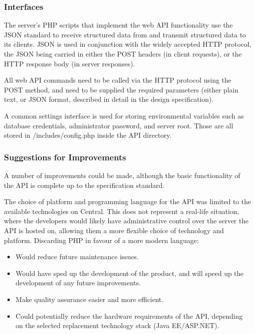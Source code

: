     \subsubsection{Interfaces}
       The server's PHP scripts that implement the web API functionality use the 
    JSON standard to receive structured data from and transmit structured data 
    to its clients. JSON is used in conjunction with the widely accepted HTTP
    protocol, the JSON being carried in either the POST headers (in client 
    requests), or the HTTP response body (in server responses).
    
    All web API commands need to be called via the HTTP protocol using the POST
    method, and need to be supplied the required parameters (either plain text,
    or JSON format, described in detail in the design specification).
	
	A common settings interface is used for storing environmental variables 
	such as database credentials, administrator password, and server root.
	Those are all stored in /includes/config.php inside the API
	directory.

    \subsubsection{Suggestions for Improvements}

A number of improvements could be made, although the basic functionality of
	the API is complete up to the specification standard.
	
	The choice of platform and programming language for the API was limited to 
	the available technologies on Central. This does not represent a real-life
	situation, where the developers would likely have administrative control
	over the server the API is hosted on, allowing them a more flexible choice
	of technology and platform. Discarding PHP in favour of a more modern
	language: 
        \begin{itemize}
            \item Would reduce future maintenance issues.
            \item Would have sped up the development of the product, and will speed up
	   the development of any future improvements.
            \item Make quality assurance easier and more efficient.
            \item Could potentially reduce the hardware requirements of the API,
	   depending on the selected replacement technology stack (Java EE/ASP.NET).

        \end{itemize}

